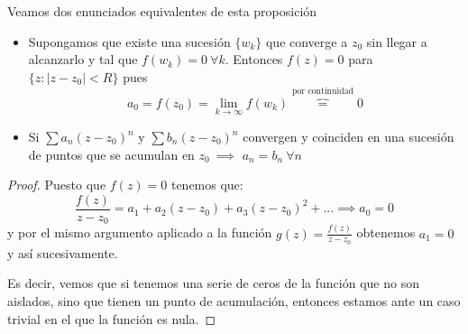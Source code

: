 \documentclass{apuntes}
\begin{document}
\begin{prop}
Veamos dos enunciados equivalentes de esta proposición
\begin{itemize}
\item Supongamos que existe una sucesión $\{w_k\}$ que converge a $z_0$ sin llegar a alcanzarlo y tal que $f(w_k)=0 \ \forall k$. Entonces $f(z)=0$ para $\{z: |z-z_0|<R\}$ pues
\[a_0=f(z_0)=\lim_{k \to \infty} f(w_k) \overbrace{=}^{\text{por continuidad}} 0 \]
\item Si $\sum a_n(z-z_0)^n$ y $\sum b_n(z-z_0)^n$ convergen y coinciden en una sucesión de puntos que se acumulan en $z_0 \ \implies$ $a_n=b_n \ \forall n$
\end{itemize}
\end{prop}
\begin{proof}
Puesto que $f(z)=0$ tenemos que:
\[\frac{f(z)}{z-z_0}=a_1+a_2(z-z_0)+a_3(z-z_0)^2+... \implies a_0=0\]
y por el mismo argumento aplicado a la función $g(z)=\frac{f(z)}{z-z_0}$ obtenemos $a_1=0$ y así sucesivamente.

Es decir, vemos que si tenemos una serie de ceros de la función que no son aislados, sino que tienen un punto de acumulación, entonces estamos ante un caso trivial en el que la función es nula.
\end{proof}
\end{document}
